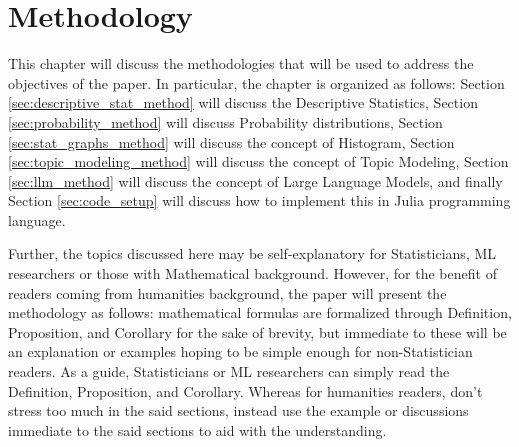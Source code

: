 \chapter{Methodology}
This chapter will discuss the methodologies that will be used to address the objectives of the paper. In particular, the chapter is organized as follows: Section \ref{sec:descriptive_stat_method} will discuss the Descriptive Statistics, Section \ref{sec:probability_method} will discuss Probability distributions, Section \ref{sec:stat_graphs_method} will discuss the concept of Histogram, Section \ref{sec:topic_modeling_method} will discuss the concept of Topic Modeling, Section \ref{sec:llm_method} will discuss the concept of Large Language Models, and finally Section \ref{sec:code_setup} will discuss how to implement this in Julia programming language.

Further, the topics discussed here may be self-explanatory for Statisticians, ML researchers or those with Mathematical background. However, for the benefit of readers coming from humanities background, the paper will present the methodology as follows: mathematical formulas are formalized through Definition, Proposition, and Corollary for the sake of brevity, but immediate to these will be an explanation or examples hoping to be simple enough for non-Statistician readers. As a guide, Statisticians or ML researchers can simply read the Definition, Proposition, and Corollary. Whereas for humanities readers, don't stress too much in the said sections, instead use the example or discussions immediate to the said sections to aid with the understanding.
